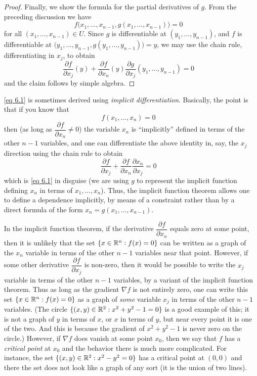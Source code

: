 \begin{proof}
  Finally, we show the formula for the partial derivatives of \(g\).
  From the preceding discussion we have
  \[
    f\big(x_1, \dots, x_{n - 1}, g(x_1, \dots, x_{n - 1})\big) = 0
  \]
  for all \((x_1, \dots, x_{n - 1}) \in U\).
  Since \(g\) is differentiable at \((y_1, \dots, y_{n - 1})\), and \(f\) is differentiable at \(\big(y_1, \dots, y_{n - 1}, g(y_1, \dots, y_{n - 1})\big) = y\), we may use the chain rule, differentiating in \(x_j\), to obtain
  \[
    \dfrac{\partial f}{\partial x_j}(y) + \dfrac{\partial f}{\partial x_n}(y) \dfrac{\partial g}{\partial x_j}(y_1, \dots, y_{n - 1}) = 0
  \]
  and the claim follows by simple algebra.
\end{proof}

\begin{rmk}\label{6.8.2}
  \cref{eq 6.1} is sometimes derived using \emph{implicit differentiation}.
  Basically, the point is that if you know that
  \[
    f(x_1, \dots, x_n) = 0
  \]
  then (as long as \(\dfrac{\partial f}{\partial x_n} \neq 0\)) the variable \(x_n\) is ``implicitly'' defined in terms of the other \(n - 1\) variables, and one can differentiate the above identity in, say, the \(x_j\) direction using the chain rule to obtain
  \[
    \dfrac{\partial f}{\partial x_j} + \dfrac{\partial f}{\partial x_n} \dfrac{\partial x_n}{\partial x_j} = 0
  \]
  which is \cref{eq 6.1} in disguise
  (we are using \(g\) to represent the implicit function defining \(x_n\) in terms of \(x_1, \dots, x_n\)).
  Thus, the implicit function theorem allows one to define a dependence implicitly, by means of a constraint rather than by a direct formula of the form \(x_n = g(x_1, \dots, x_{n - 1})\).
\end{rmk}

\begin{note}
  In the implicit function theorem, if the derivative \(\dfrac{\partial f}{\partial x_n}\) equals zero at some point, then it is unlikely that the set \(\{x \in \mathbb{R}^n : f(x) = 0\}\) can be written as a graph of the \(x_n\) variable in terms of the other \(n - 1\) variables near that point.
  However, if some other derivative \(\dfrac{\partial f}{\partial x_j}\) is non-zero, then it would be possible to write the \(x_j\) variable in terms of the other \(n - 1\) variables, by a variant of the implicit function theorem.
  Thus as long as the gradient \(\nabla f\) is not entirely zero, one can write this set \(\{x \in \mathbb{R}^n : f(x) = 0\}\) as a graph of \emph{some} variable \(x_j\) in terms of the other \(n - 1\) variables.
  (The circle \(\{(x, y) \in \mathbb{R}^2 : x^2 + y^2 - 1 = 0\}\) is a good example of this;
  it is not a graph of \(y\) in terms of \(x\), or \(x\) in terms of \(y\), but near every point it is one of the two.
  And this is because the gradient of \(x^2 + y^2 - 1\) is never zero on the circle.)
  However, if \(\nabla f\) does vanish at some point \(x_0\), then we say that \(f\) has a \emph{critical point} at \(x_0\) and the behavior there is much more complicated.
  For instance, the set \(\{(x, y) \in \mathbb{R}^2 : x^2 - y^2 = 0\}\) has a critical point at \((0, 0)\) and there the set does not look like a graph of any sort
  (it is the union of two lines).
\end{note}

